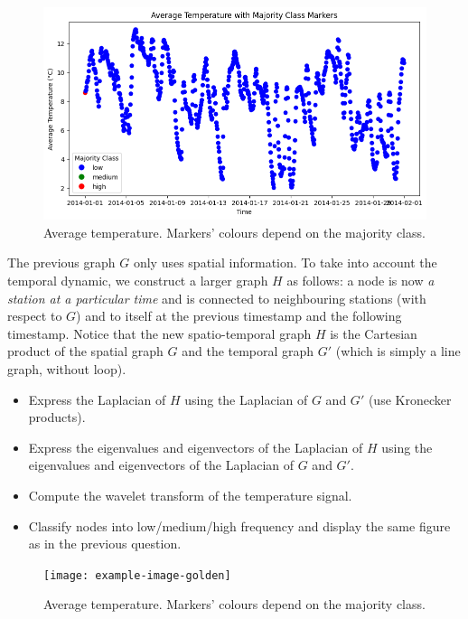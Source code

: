 \documentclass[11pt]{article}
\begin{document}
\begin{solution}
\begin{figure}
    \centering
    \begin{minipage}[t]{1\textwidth}
    \centerline{\includegraphics[width=\textwidth]{output3.png}}
    \end{minipage}
    \caption{Average temperature. Markers' colours depend on the majority class.}
\end{figure}
\end{solution}

\newpage
\begin{exercise}
The previous graph $G$ only uses spatial information.
To take into account the temporal dynamic, we construct a larger graph $H$ as follows: a node is now \textit{a station at a particular time} and is connected to neighbouring stations (with respect to $G$) and to itself at the previous timestamp and the following timestamp.
Notice that the new spatio-temporal graph $H$ is the Cartesian product of the spatial graph $G$ and the temporal graph $G'$ (which is simply a line graph, without loop).

\begin{itemize}
    \item Express the Laplacian of $H$ using the Laplacian of $G$ and $G'$ (use Kronecker products).
    \item Express the eigenvalues and eigenvectors of the Laplacian of $H$ using the eigenvalues and eigenvectors of the Laplacian of $G$ and $G'$.
    \item Compute the wavelet transform of the temperature signal.
    \item Classify nodes into low/medium/high frequency and display the same figure as in the previous question.
\end{itemize}
\end{exercise}

\begin{solution}
\begin{figure}
    \centering
    \begin{minipage}[t]{0.8\textwidth}
    \centerline{\texttt{[image: example-image-golden]}}
    \end{minipage}
    \caption{Average temperature. Markers' colours depend on the majority class.}
\end{figure}
\end{solution}
\end{document}
